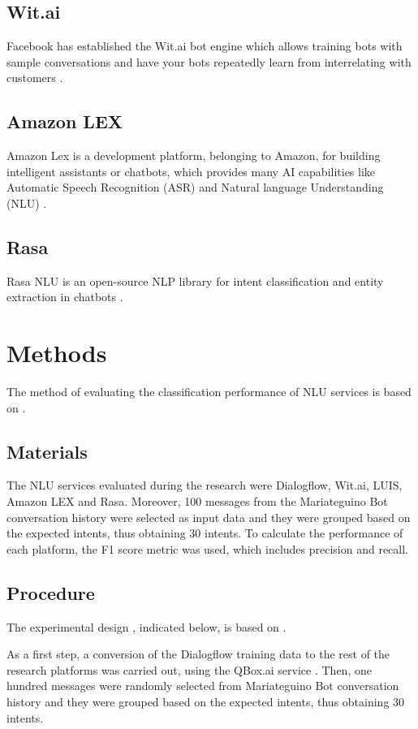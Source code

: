 \documentclass[conference]{IEEEtran}
\begin{document}
\subsection{Wit.ai}
Facebook has established the Wit.ai bot engine which allows training bots with sample conversations and have your bots repeatedly learn from interrelating with customers \cite{seligman2018artificial}.
\subsection{Amazon LEX}
Amazon Lex is a development platform, belonging to Amazon, for building intelligent assistants or chatbots, which provides many AI capabilities like Automatic Speech Recognition (ASR) and Natural language Understanding (NLU) \cite{tripuraneni2019hands}.
\subsection{Rasa}
Rasa NLU is an open-source NLP library for intent classification and entity extraction in chatbots \cite{raj2018building}.

\section{Methods}
The method of evaluating the classification performance of NLU services is based on \cite{Braun2017}.
\subsection{Materials}
The NLU services evaluated during the research were Dialogflow, Wit.ai, LUIS, Amazon LEX and Rasa. Moreover, 100 messages from the Mariateguino Bot conversation history were selected as input data and they were grouped based on the expected intents, thus obtaining 30 intents. To calculate the performance of each platform, the F1 score metric was used, which includes precision and recall.

\subsection{Procedure}
The experimental design , indicated below, is based on \cite{Braun2017}.

As a first step, a conversion of the Dialogflow training data to the rest of the research platforms was carried out, using the QBox.ai service \cite{qbox2020}. Then, one hundred messages were randomly selected from Mariateguino Bot conversation history and they were grouped based on the expected intents, thus obtaining 30 intents.
\end{document}
